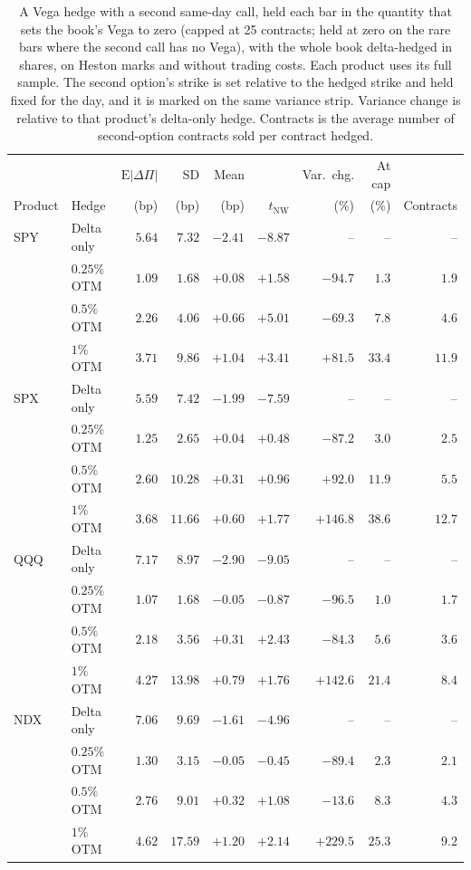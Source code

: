 \begin{table}[tbp]
\centering
\scriptsize
\setlength{\tabcolsep}{3pt}
\begin{tabular}{llrrrrrrr}
\toprule
 &  & $\mathrm{E}|\Delta\Pi|$ & SD & Mean &  & Var.\ chg. & At cap &  \\
Product & Hedge & (bp) & (bp) & (bp) & $t_{\mathrm{NW}}$ & (\%) & (\%) & Contracts \\
\midrule
SPY & Delta only & $5.64$ & $7.32$ & $-2.41$ & $-8.87$ & -- & -- & -- \\
 & $0.25\%$ OTM & $1.09$ & $1.68$ & $+0.08$ & $+1.58$ & $-94.7$ & $1.3$ & $1.9$ \\
 & $0.5\%$ OTM & $2.26$ & $4.06$ & $+0.66$ & $+5.01$ & $-69.3$ & $7.8$ & $4.6$ \\
 & $1\%$ OTM & $3.71$ & $9.86$ & $+1.04$ & $+3.41$ & $+81.5$ & $33.4$ & $11.9$ \\
\midrule
SPX & Delta only & $5.59$ & $7.42$ & $-1.99$ & $-7.59$ & -- & -- & -- \\
 & $0.25\%$ OTM & $1.25$ & $2.65$ & $+0.04$ & $+0.48$ & $-87.2$ & $3.0$ & $2.5$ \\
 & $0.5\%$ OTM & $2.60$ & $10.28$ & $+0.31$ & $+0.96$ & $+92.0$ & $11.9$ & $5.5$ \\
 & $1\%$ OTM & $3.68$ & $11.66$ & $+0.60$ & $+1.77$ & $+146.8$ & $38.6$ & $12.7$ \\
\midrule
QQQ & Delta only & $7.17$ & $8.97$ & $-2.90$ & $-9.05$ & -- & -- & -- \\
 & $0.25\%$ OTM & $1.07$ & $1.68$ & $-0.05$ & $-0.87$ & $-96.5$ & $1.0$ & $1.7$ \\
 & $0.5\%$ OTM & $2.18$ & $3.56$ & $+0.31$ & $+2.43$ & $-84.3$ & $5.6$ & $3.6$ \\
 & $1\%$ OTM & $4.27$ & $13.98$ & $+0.79$ & $+1.76$ & $+142.6$ & $21.4$ & $8.4$ \\
\midrule
NDX & Delta only & $7.06$ & $9.69$ & $-1.61$ & $-4.96$ & -- & -- & -- \\
 & $0.25\%$ OTM & $1.30$ & $3.15$ & $-0.05$ & $-0.45$ & $-89.4$ & $2.3$ & $2.1$ \\
 & $0.5\%$ OTM & $2.76$ & $9.01$ & $+0.32$ & $+1.08$ & $-13.6$ & $8.3$ & $4.3$ \\
 & $1\%$ OTM & $4.62$ & $17.59$ & $+1.20$ & $+2.14$ & $+229.5$ & $25.3$ & $9.2$ \\
\bottomrule
\end{tabular}
\caption{A Vega hedge with a second same-day call, held each bar in the quantity that sets the book's Vega to zero (capped at 25 contracts; held at zero on the rare bars where the second call has no Vega), with the whole book delta-hedged in shares, on Heston marks and without trading costs. Each product uses its full sample. The second option's strike is set relative to the hedged strike and held fixed for the day, and it is marked on the same variance strip. Variance change is relative to that product's delta-only hedge. Contracts is the average number of second-option contracts sold per contract hedged.}
\label{tab:volhedge}
\end{table}
